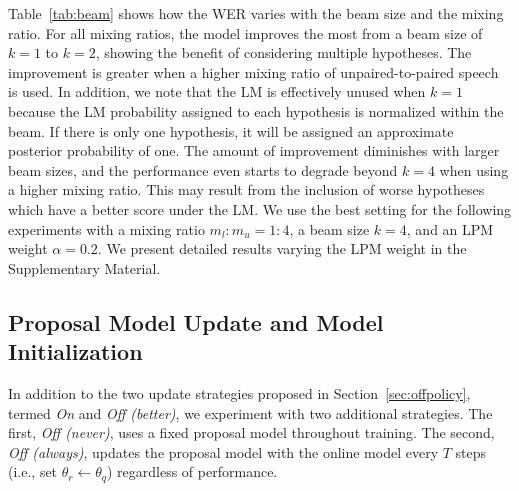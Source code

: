 Table~\ref{tab:beam} shows how the WER varies with the beam size and the mixing ratio. 
For all mixing ratios, the model improves the most from a beam size of $k\!=\!1$ to $k\!=\!2$, showing the benefit of considering multiple hypotheses.
The improvement is greater when a higher mixing ratio of unpaired-to-paired speech is used.
In addition, we note that the LM is effectively unused when $k\!=\!1$ because the LM probability assigned to each hypothesis is normalized within the beam. If there is only one hypothesis, it will be assigned an approximate posterior probability of one.
The amount of improvement diminishes with larger beam sizes, and the performance even starts to degrade beyond $k\!=\!4$ when using a higher mixing ratio.
This may result from the inclusion of worse hypotheses which have a better score under the LM.
We use the best setting for the following experiments with a mixing ratio $m_{l} : m_{u} = 1 : 4$, a beam size $k\!=\!4$, and an LPM weight $\alpha\!=\!0.2$.
We present detailed results varying the LPM weight in the Supplementary Material.

\subsection{Proposal Model Update and Model Initialization}\label{sec:res_init_prop}

In addition to the two update strategies proposed in Section~\ref{sec:offpolicy}, termed \emph{On} and \emph{Off (better)}, we experiment with two additional strategies.
The first, \emph{Off (never)}, uses a fixed proposal model throughout training.
The second, \emph{Off (always)}, updates the proposal model with the online model every $T$ steps (i.e., set $\theta_r \leftarrow \theta_q$) regardless of performance.

